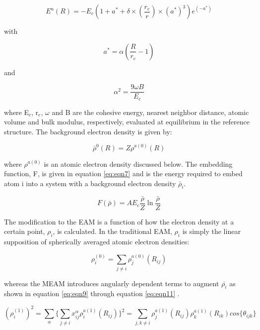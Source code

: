 \documentclass[review]{elsarticle}
\begin{document}
\begin{equation}
\label{eq:eqn3}
 E^{u}(R) = -E_{c} (1 + a^{*} + \delta \times (\frac{r_{e}}{r}) \times (a^{*})^{3}) e^{(-a^{*})}
 \end{equation}

with

\begin{equation}
\label{eq:eqn4}
a^{*} = \alpha ( \frac{R}{r_{e}} - 1)
\end{equation}

and

\begin{equation}
\label{eq:eqn5}
\alpha^{2} = \frac{9\omega B}{E_{c}}
\end{equation}

where E$_{c}$, r$_{e}$, $\omega$ and B are the cohesive energy, nearest neighbor distance, atomic volume and bulk modulus, respectively, evaluated at equilibrium in the reference structure.  The background electron density is given by:

\begin{equation}
\label{eq:eqn6}
\bar{\rho}^{0}(R) = Z \rho^{a(0)} (R)
\end{equation}

where $\rho^{a(0)}$  is an atomic electron density discussed below.  The embedding function, F, is given in equation \ref{eq:eqn7} and is the energy required to embed atom i into a system with a background electron density $\bar{\rho}_{i}$.  

\begin{equation}
\label{eq:eqn7}
F(\bar{\rho}) = AE_{c} \frac{\bar{\rho}}{Z}\ln\frac{\bar{\rho}}{Z}
\end{equation}

The modification to the EAM is a function of how the electron density at a certain point, $\rho_{i}$, is calculated.  In the traditional EAM, $\rho_{i}$ is simply the linear supposition of spherically averaged atomic electron densities:

\begin{equation}
\label{eq:eqn8}
\rho_{i}^{(0)} = \sum_{j \neq i} \rho_{j}^{a(0)} (R_{ij})
\end{equation}

whereas the MEAM introduces angularly dependent terms to augment $\bar{\rho_{i}}$ as shown in equation \ref{eq:eqn9} through equation \ref{eq:eqn11} \cite{baskes2000, baskes1987}.  

\begin{equation}
\label{eq:eqn9}
(\rho_{i}^{(1)})^{2}=\sum_{\alpha} \{ \sum_{j \neq i}x_{ij}^{\alpha}\rho_{i}^{a(1)}(R_{ij})\}^{2} = \sum_{j,k \neq i}\rho_{j}^{a(1)}(R_{ij})\rho_{k}^{a(1)}(R_{ik})cos\{\theta_{ijk}\}
\end{equation}
\end{document}
